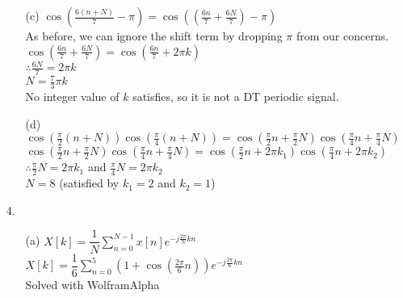 \documentclass{article}
\begin{document}
\begin{enumerate}
\begin{enumerate}
	\item[(c)]
			$\cos\left(\frac{6\left(n + N\right)}{7} - \pi\right) = \cos\left(\left(\frac{6n}{7} + \frac{6N}{7}\right) - \pi\right)$\\
			
			As before, we can ignore the shift term by dropping $\pi$ from our concerns.\\
			
			$\cos\left(\frac{6n}{7} + \frac{6N}{7}\right) = \cos\left(\frac{6n}{7} + 2\pi k\right)$\\
			
			$\therefore \frac{6N}{7} = 2\pi k$\\
			
			$N = \frac{7}{3}\pi k$\\
			
			No integer value of $k$ satisfies, so it is not a DT periodic signal.\\

	\item[(d)]
			$\cos\left(\frac{\pi}{2}\left(n + N\right)\right)\cos\left(\frac{\pi}{4}\left(n + N\right)\right) = \cos\left(\frac{\pi}{2}n + \frac{\pi}{2}N\right)\cos\left(\frac{\pi}{4}n + \frac{\pi}{4}N\right)$\\
			
			$\cos\left(\frac{\pi}{2}n + \frac{\pi}{2}N\right)\cos\left(\frac{\pi}{4}n + \frac{\pi}{4}N\right) = \cos\left(\frac{\pi}{2}n + 2\pi k_1\right)\cos\left(\frac{\pi}{4}n + 2\pi k_2\right)$\\
			
			$\therefore \frac{\pi}{2}N = 2\pi k_1$ and $\frac{\pi}{4}N = 2\pi k_2$\\
			
			$N = 8$ (satisfied by $k_1=2$ and $k_2=1$)\\
	\end{enumerate}

\newpage

\item[4.]
	\begin{enumerate}
	\item[(a)]
			$X\left[k\right] = \dfrac{1}{N} \displaystyle\sum_{n=0}^{N-1} x\left[n\right]e^{-j\frac{2\pi}{N}kn}$\\
			
			$X\left[k\right] = \dfrac{1}{6} \displaystyle\sum_{n=0}^{5} \left(1 + \cos\left(\frac{2\pi}{6}n\right)\right)e^{-j\frac{2\pi}{6}kn}$\\
			
			Solved with WolframAlpha\\
			

\end{enumerate}
\end{enumerate}
\end{document}
